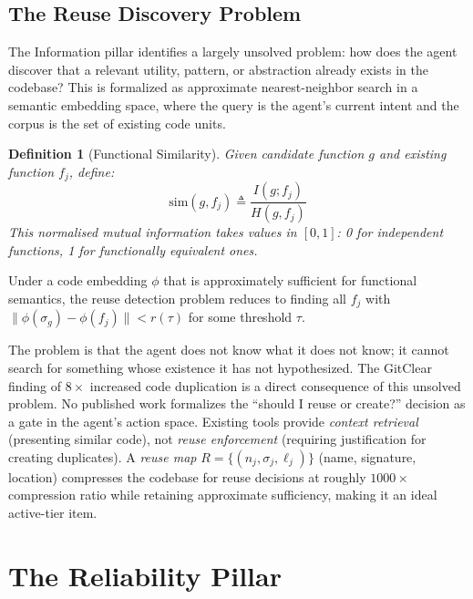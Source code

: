 \documentclass[11pt, a4paper]{googledeepmind}
\newtheorem{definition}{Definition}[section]
\begin{document}
\subsection{The Reuse Discovery Problem}

The Information pillar identifies a largely unsolved problem: how does the agent discover that a relevant utility, pattern, or abstraction already exists in the codebase? This is formalized as approximate nearest-neighbor search in a semantic embedding space, where the query is the agent's current intent and the corpus is the set of existing code units.

\begin{definition}[Functional Similarity]
Given candidate function $g$ and existing function $f_j$, define:
\begin{equation}
    \text{sim}(g, f_j) \triangleq \frac{I(g; f_j)}{H(g, f_j)}
\end{equation}
This normalised mutual information takes values in $[0,1]$: 0 for independent functions, 1 for functionally equivalent ones.
\end{definition}

Under a code embedding $\phi$ that is approximately sufficient for functional semantics, the reuse detection problem reduces to finding all $f_j$ with $\|\phi(\sigma_g) - \phi(f_j)\| < r(\tau)$ for some threshold $\tau$.

The problem is that the agent does not know what it does not know; it cannot search for something whose existence it has not hypothesized. The GitClear finding of $8\times$ increased code duplication \citep{gitclear2025} is a direct consequence of this unsolved problem. No published work formalizes the ``should I reuse or create?'' decision as a gate in the agent's action space. Existing tools provide \emph{context retrieval} (presenting similar code), not \emph{reuse enforcement} (requiring justification for creating duplicates). A \emph{reuse map} $R = \{(n_j, \sigma_j, \ell_j)\}$ (name, signature, location) compresses the codebase for reuse decisions at roughly $1000\times$ compression ratio while retaining approximate sufficiency, making it an ideal active-tier item.


\section{The Reliability Pillar}
\label{sec:reliability}
\end{document}
